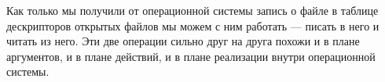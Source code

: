  Как только мы получили от операционной системы запись о файле в таблице дескрипторов открытых файлов мы можем с ним работать --- писать в него и читать из него. Эти две операции сильно друг на друга похожи и в плане аргументов, и в плане действий, и в плане реализации внутри операционной системы.